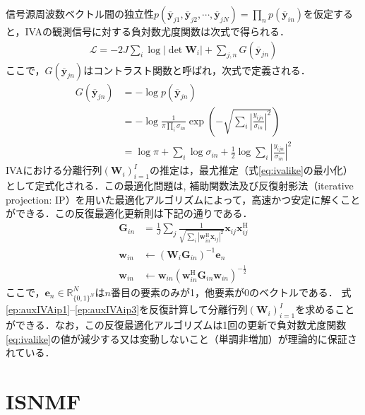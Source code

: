 信号源周波数ベクトル間の独立性$p(\overline{\bm{y}}_{j1}, \overline{\bm{y}}_{j2}, \cdots, \overline{\bm{y}}_{jN}) = \prod_n p(\overline{\bm{y}}_{in})$を仮定すると，IVAの観測信号に対する負対数尤度関数は次式で得られる．
\begin{align}
    \mathcal{L} = -2J \sum_i \log |\det \bm{W}_i| + \sum_{j,n} G(\overline{\bm{y}}_{jn})
    \label{eq:ivalike}
\end{align}
ここで，$G(\overline{\bm{y}}_{jn})$はコントラスト関数と呼ばれ，次式で定義される．
\begin{align}
  \nonumber G(\overline{\bm{y}}_{jn}) &= -\log p(\overline{\bm{y}}_{jn}) \\
  \nonumber  &= -\log \frac{1}{\pi \prod_{i} \sigma_{in}} \exp \left(  - \sqrt{ \sum_i \left| \frac{y_{ijn}}{\sigma_{in}} \right|^2}  \right) \\
  &= \log \pi + \sum_i \log \sigma_{in} + \frac{1}{2} \log \sum_i \left| \frac{y_{ijn}}{\sigma_{in}}\right|^2
\end{align}
IVAにおける分離行列$( \bm{W}_i )_{i=1}^I$の推定は，最尤推定（式\eqref{eq:ivalike}の最小化）として定式化される．この最適化問題は, 補助関数法\cite{auxfunc}{及び反復射影法（iterative projection: IP）\cite{auxIVA}を用いた最適化アルゴリズムによって，高速かつ安定に解くことができる\cite{stable_auxIVA}．この反復最適化更新則は下記の通りである．}
\begin{align}
\bm{G}_{in} &= \frac{1}{J} \sum_j \frac{1}{\sqrt{\sum_{i} |\bm{w}_{in}^\mathrm{H}\bm{x}_{ij}|^{2}}} \bm{x}_{ij} \bm{x}_{ij}^{\mathrm{H}} \label{ep:auxIVAip1} \\
\bm{w}_{in} &\leftarrow (\bm{W}_i \bm{G}_{in})^{-1} \bm{e}_n \label{ep:auxIVAip2} \\
\bm{w}_{in} &\leftarrow \bm{w}_{in} ( \bm{w}_{in}^{\mathrm{H}} \bm{G}_{in} \bm{w}_{in} )^{-\frac{1}{2}} \label{ep:auxIVAip3}
\end{align}
ここで，$\bm{e}_{n} \in \mathbb{R}^{N}_{\{ 0, 1 \}^N}$は$n$番目の要素のみが1，他要素が0のベクトルである．
{式\eqref{ep:auxIVAip1}--\eqref{ep:auxIVAip3}を反復計算して分離行列$( \bm{W}_i )_{i=1}^I$を求めることができる．なお，この反復最適化アルゴリズムは1回の更新で負対数尤度関数\eqref{eq:ivalike}の値が減少する又は変動しないこと（単調非増加）が理論的に保証されている．}


\section{ISNMF}
\label{sec:conv:isnmf}

